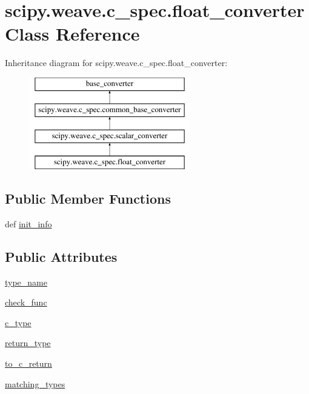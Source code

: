 \hypertarget{classscipy_1_1weave_1_1c__spec_1_1float__converter}{}\section{scipy.\+weave.\+c\+\_\+spec.\+float\+\_\+converter Class Reference}
\label{classscipy_1_1weave_1_1c__spec_1_1float__converter}
Inheritance diagram for scipy.\+weave.\+c\+\_\+spec.\+float\+\_\+converter\+:\begin{figure}[H]
\begin{center}
\leavevmode
\includegraphics[height=4.000000cm]{classscipy_1_1weave_1_1c__spec_1_1float__converter}
\end{center}
\end{figure}
\subsection*{Public Member Functions}
\begin{DoxyCompactItemize}
\item 
def \hyperlink{classscipy_1_1weave_1_1c__spec_1_1float__converter_a62e8403fd9f43a4fda71e4483ba709d9}{init\+\_\+info}
\end{DoxyCompactItemize}
\subsection*{Public Attributes}
\begin{DoxyCompactItemize}
\item 
\hyperlink{classscipy_1_1weave_1_1c__spec_1_1float__converter_ae61554a19466577ae87c758ee007d03e}{type\+\_\+name}
\item 
\hyperlink{classscipy_1_1weave_1_1c__spec_1_1float__converter_ac8f03a59da179443358a9bc69f8fb617}{check\+\_\+func}
\item 
\hyperlink{classscipy_1_1weave_1_1c__spec_1_1float__converter_a006dc2f6c29bcedd4a6f0604ebf600f1}{c\+\_\+type}
\item 
\hyperlink{classscipy_1_1weave_1_1c__spec_1_1float__converter_ad6cf5970c2987c4ec7d987f50c134c16}{return\+\_\+type}
\item 
\hyperlink{classscipy_1_1weave_1_1c__spec_1_1float__converter_aefba6bb771de64fbcd67a537bdeb98d1}{to\+\_\+c\+\_\+return}
\item 
\hyperlink{classscipy_1_1weave_1_1c__spec_1_1float__converter_aa199ea851b390b4146e4e497fea98194}{matching\+\_\+types}
\end{DoxyCompactItemize}


